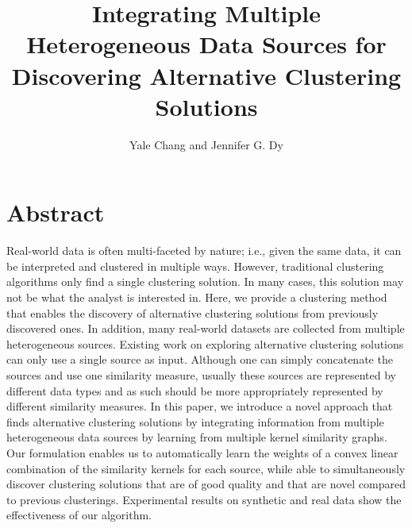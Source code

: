 \documentclass{article}
\title{Integrating Multiple Heterogeneous Data Sources for Discovering Alternative Clustering Solutions}
\author{Yale Chang and Jennifer G. Dy}
\begin{document}
\maketitle
\section{Abstract}
Real-world data is often multi-faceted by nature; i.e., given the same data, it can be interpreted and clustered in multiple ways.  However, traditional clustering algorithms only find a single clustering solution.  In many cases, this solution may not be what the analyst is interested in.  Here, we provide a clustering method that enables the discovery of alternative clustering solutions from previously discovered ones.  In addition, many real-world datasets are collected from multiple heterogeneous sources.  Existing work on exploring alternative clustering solutions can only use a single source as input.  Although one can simply concatenate the sources and use one similarity measure, usually these sources are represented by different data types and as such should be more appropriately represented by different similarity measures.  In this paper, we introduce a novel approach that finds alternative clustering solutions by integrating information from multiple heterogeneous data sources by learning from multiple kernel similarity graphs.  Our formulation enables us to automatically learn the weights of a convex linear combination of the similarity kernels for each source, while able to simultaneously discover clustering solutions that are of good quality and that are novel compared to previous clusterings.  
%
Experimental results on synthetic and real data show the effectiveness of our algorithm. 
\end{document}
